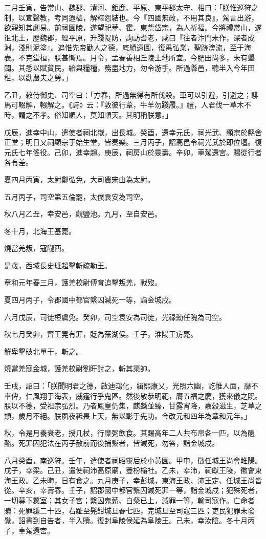 \begin{pinyinscope}
二月壬寅，告常山、魏郡、清河、鉅鹿、平原、東平郡太守、相曰：「朕惟巡狩之制，以宣聲教，考同遐樯，解釋怨結也。今『四國無政，不用其良』，駕言出游，欲親知其劇易。前祠園陵，遂望祀華、霍，東祡岱宗，為人祈福。今將禮常山，遂徂北土，歷魏郡，經平原，升踐隄防，詢訪耆老，咸曰『往者汴門未作，深者成淵，淺則泥塗』。追惟先帝勤人之德，底績遠圖，復禹弘業，聖跡滂流，至于海表。不克堂桓，朕甚慚焉。月令，孟春善相丘陵土地所宜。今肥田尚多，未有墾闢。其悉以賦貧民，給與糧種，務盡地力，勿令游手。所過縣邑，聽半入今年田租，以勸農夫之勞。」

乙丑，敕侍御史、司空曰：「方春，所過無得有所伐殺。車可以引避，引避之；騑馬可輟解，輟解之。《詩》云：『敦彼行葦，牛羊勿踐履。』禮，人君伐一草木不時，謂之不孝。俗知順人，莫知順天。其明稱朕意。」

戊辰，進幸中山，遣使者祠北嶽，出長城。癸酉，還幸元氏，祠光武、顯宗於縣舍正堂；明日又祠顯宗于始生堂，皆奏樂。三月丙子，詔高邑令祠光武於即位壇。復元氏七年傜役。己卯，進幸趙。庚辰，祠房山於靈壽。辛卯，車駕還宮。賜從行者各有差。

夏四月丙寅，太尉鄭弘免，大司農宋由為太尉。

五月丙子，司空第五倫罷，太僕袁安為司空。

秋八月乙丑，幸安邑，觀鹽池。九月，至自安邑。

冬十月，北海王基薨。

燒當羌叛，寇隴西。

是歲，西域長史班超擊斬疏勒王。

章和元年春三月，護羌校尉傅育追擊叛羌，戰歿。

夏四月丙子，令郡國中都官繫囚減死一等，詣金城戍。

六月戊辰，司徒桓虞免。癸卯，司空袁安為司徒，光祿勳任隗為司空。

秋七月癸卯，齊王晃有罪，貶為蕪湖侯。壬子，淮陽王疠薨。

鮮卑擊破北單于，斬之。

燒當羌寇金城，護羌校尉劉盱討之，斬其渠帥。

壬戌，詔曰：「朕聞明君之德，啟迪鴻化，緝熙康乂，光照六幽，訖惟人面，靡不率俾，仁風翔于海表，威霆行乎鬼區。然後敬恭明祀，膺五福之慶，獲來儀之貺。朕以不德，受祖宗弘烈。乃者鳳皇仍集，麒麟並臻，甘露宵降，嘉穀滋生，芝草之類，歲月不絕。朕夙夜祗畏上天，無以彰于先功。今改元和四年為章和元年。」

秋，令是月養衰老，授几杖，行糜粥飲食。其賜高年二人共布帛各一匹，以為醴酪。死罪囚犯法在丙子赦前而後捕繫者，皆減死，勿笞，詣金城戍。

八月癸酉，南巡狩。壬午，遣使者祠昭靈后於小黃園。甲申，徵任城王尚會睢陽。戊子，幸梁。己丑，遣使祠沛高原廟，豐枌榆社。乙未，幸沛，祠獻王陵，徵會東海王政。乙未晦，日有食之。九月庚子，幸彭城，東海王政、沛王定、任城王尚皆從。辛亥，幸壽春。壬子，詔郡國中都官繫囚減死罪一等，詣金城戍；犯殊死者，一切募下蠶室；其女子宮；繫囚鬼薪、白粲已上，減罪一等，輸司寇作。亡命者贖：死罪縑二十匹，右趾至髡鉗城旦舂七匹，完城旦至司寇三匹；吏民犯罪未發覺，詔書到自告者，半入贖。復封阜陵侯延為阜陵王。己未，幸汝陰。冬十月丙子，車駕還宮。


\end{pinyinscope}
